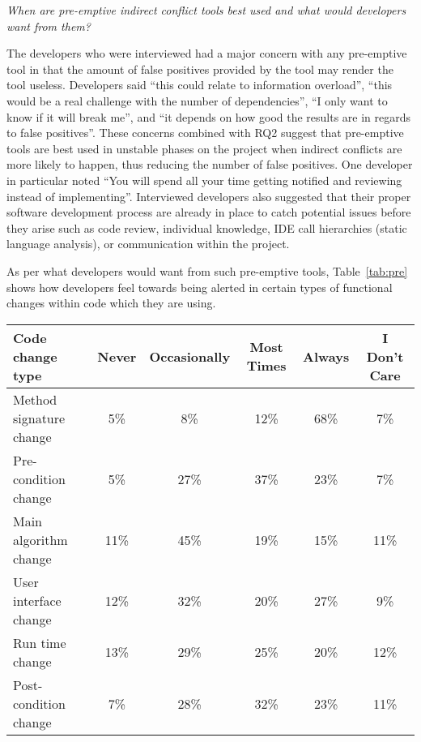 \documentclass[conference]{IEEEtran}
\begin{document}
\begin{description}[topsep=6pt]
	\item[RQ6] \textit{When are pre-emptive indirect conflict tools best used and what would developers want from them?}
\end{description}

The developers who were interviewed had a major concern with any pre-emptive tool in that the amount of false positives
provided by the tool may render the tool useless. Developers said ``this could relate to information overload'', ``this would
be a real challenge with the number of dependencies'', ``I only want to know if it will break me'', and ``it depends on how
good the results are in regards to false positives''. These concerns combined with RQ2 suggest that pre-emptive tools are
best used in unstable phases on the project when indirect conflicts are more likely to happen, thus reducing the number of false
positives. One developer in particular noted ``You will spend all your time getting notified and reviewing instead of implementing''.
Interviewed developers also suggested that their proper software development process are already in place to
catch potential issues before they arise such as code review, individual knowledge, IDE call hierarchies (static language analysis),
or communication within the project.

As per what developers would want from such pre-emptive tools, Table~\ref{tab:pre} shows how developers feel towards being 
alerted in certain types of functional changes within code which they are using.

\begin{table*}[tb!]
\begin{center}
\begin{tabular}{| p{7cm} | c | c | c | c | c |}
\hline
Code change type &Never  & Occasionally & Most Times & Always & I Don't Care \\
\hline
\hline
Method signature change & 5\% & 8\% & 12\% & 68\% & 7\% \\ \hline
Pre-condition change & 5\% & 27\% & 37\% & 23\% & 7\% \\ \hline
Main algorithm change & 11\% & 45\% & 19\% & 15\% & 11\% \\ \hline
User interface change & 12\% & 32\% & 20\% & 27\% & 9\% \\ \hline
Run time change & 13\% & 29\% & 25\% & 20\% & 12\% \\ \hline
Post-condition change & 7\% & 28\% & 32\% & 23\% & 11\% \\ \hline
\end{tabular}
\end{center}
\caption{Results of survey questions to source code changes that developers deem notification worthy, in terms of percentage
of developers surveyed.\label{tab:pre}}
\end{table*}
\end{document}
